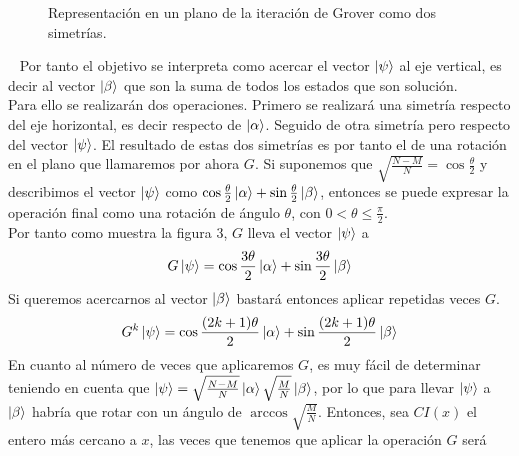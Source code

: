 \documentclass[a4paper]{article}
\numberwithin{equation}{section}
\begin{document}
\begin{figure}[!h]
\caption{Representación en un plano de la iteración de Grover como dos simetrías.}
\end{figure}\ \linebreak
Por tanto el objetivo se interpreta como acercar el vector $\ket{\psi}$ al eje vertical, es decir al vector $\ket{\beta}$ que son la suma de todos los estados que son solución.\\
\linebreak
Para ello se realizarán dos operaciones. Primero se realizará una simetría respecto del eje horizontal, es decir respecto de $\ket{\alpha}$. Seguido de otra simetría pero respecto del vector $\ket{\psi}$. El resultado de estas dos simetrías es por tanto el de una rotación en el plano que llamaremos por ahora $G$. Si suponemos que $\sqrt{\frac{N-M}{N}} = \cos \frac{\theta}{2}$ y describimos el vector $\ket{\psi}$ como $\cos \frac{\theta}{2} \ket{\alpha} + \sin \frac{\theta}{2} \ket{\beta}$, entonces se puede expresar la operación final como una rotación de ángulo $\theta$, con $0<\theta\leq \frac{\pi}{2}$.\\
\linebreak
Por tanto como muestra la figura 3, $G$ lleva el vector $\ket{\psi}$ a
\begin{equation}
G\ket{\psi} = \cos \frac{3\theta}{2}\ket{\alpha} + \sin \frac{3\theta}{2} \ket{\beta}
\end{equation}
Si queremos acercarnos al vector $\ket{\beta}$ bastará entonces aplicar repetidas veces $G$.
\begin{equation}
G^k \ket{\psi} = \cos \frac{(2k+1)\theta}{2}\ket{\alpha} + \sin \frac{(2k+1)\theta}{2} \ket{\beta}
\end{equation}
En cuanto al número de veces que aplicaremos $G$, es muy fácil de determinar teniendo en cuenta que $\ket{\psi} = \sqrt{\frac{N-M}{N}}\ket{\alpha} \sqrt{\frac{M}{N}}\ket{\beta}$, por lo que para llevar $\ket{\psi}$ a $\ket{\beta}$ habría que rotar con un ángulo de $\arccos \sqrt{\frac{M}{N}}$. Entonces, sea $CI(x)$ el entero más cercano a $x$, las veces que tenemos que aplicar la operación $G$ será
\end{document}

